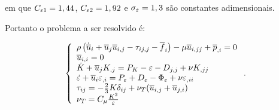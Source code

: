 \noindent em que $C_{\varepsilon 1}=1,44$, $C_{\varepsilon 2}=1,92$ e $\sigma_\varepsilon=1,3$ são constantes adimensionais.

Portanto o problema a ser resolvido é:

\begin{equation}
    \left\{
    \begin{array}{l}
        \rho\left({\dot{\overline{u}}_i+\overline{u}_j\overline{u}_{i,j}-\tau_{ij,j}-\overline{f}_i}\right)-\mu\overline{u}_{i,jj}+\overline{p}_{,i}=0    \\
        \overline{u}_{i,i}=0                                                                                               \\
        \dot{K}+\overline{u}_jK_{,j}=P_K-\varepsilon-D_{j,j}+\nu K_{,jj}                                                   \\
        \dot{\varepsilon}+\overline{u}_i\varepsilon_{,i}=P_\varepsilon+D_\varepsilon-\Phi_\varepsilon+\nu\varepsilon_{,ii} \\
        \tau_{ij}=-\frac{2}{3}K\delta_{ij}+\nu_T(\overline{u}_{i,j}+\overline{u}_{j,i})                                         \\
        \nu_T=C_\mu\frac{K^2}{\varepsilon}
    \end{array}
    \right.\text{.}
\end{equation}